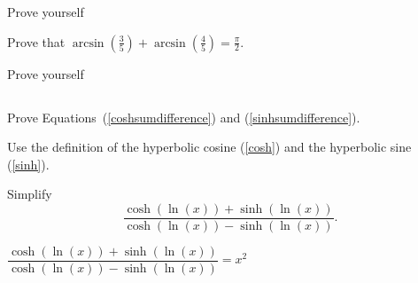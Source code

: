 \begin{Answer}\phantom{}
    Prove  yourself
\end{Answer}

\begin{Exercise}[difficulty = 1] Prove that $\arcsin \left( \frac{3}{5} \right) + \arcsin \left( \frac{4}{5} \right) = \frac{\pi}{2}$.

\end{Exercise}

\begin{Answer}\phantom{}
    Prove  yourself
\end{Answer}

\subsection*{}

\begin{Exercise}[difficulty = 1] Prove Equations~(\ref{coshsumdifference}) and (\ref{sinhsumdifference}).

\end{Exercise}

\begin{Answer}\phantom{}
    Use the definition of the hyperbolic cosine (\ref{cosh}) and the hyperbolic sine (\ref{sinh}).
\end{Answer}

\begin{Exercise}[difficulty = 1] Simplify
\[ \dfrac{\cosh \left(\ln(x) \right) + \sinh \left(\ln(x) \right)}{\cosh \left(\ln(x) \right) - \sinh \left(\ln(x) \right)}.\]

\end{Exercise}

\begin{Answer}\phantom{}
    $ \dfrac{\cosh \left(\ln(x) \right) + \sinh \left(\ln(x) \right)}{\cosh \left(\ln(x) \right) - \sinh \left(\ln(x) \right)} = x^2$
\end{Answer}


